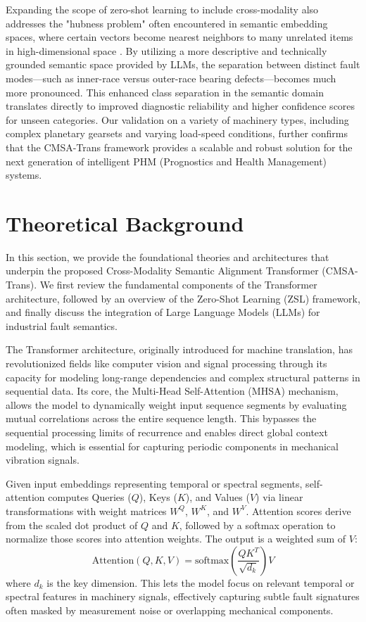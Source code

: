 \documentclass[journal]{IEEEtran}
\begin{document}
Expanding the scope of zero-shot learning to include cross-modality also addresses the "hubness problem" often encountered in semantic embedding spaces, where certain vectors become nearest neighbors to many unrelated items in high-dimensional space \cite{radovanovic2010hubs}. By utilizing a more descriptive and technically grounded semantic space provided by LLMs, the separation between distinct fault modes—such as inner-race versus outer-race bearing defects—becomes much more pronounced. This enhanced class separation in the semantic domain translates directly to improved diagnostic reliability and higher confidence scores for unseen categories. Our validation on a variety of machinery types, including complex planetary gearsets and varying load-speed conditions, further confirms that the CMSA-Trans framework provides a scalable and robust solution for the next generation of intelligent PHM (Prognostics and Health Management) systems.

\section{Theoretical Background}
In this section, we provide the foundational theories and architectures that underpin the proposed Cross-Modality Semantic Alignment Transformer (CMSA-Trans). We first review the fundamental components of the Transformer architecture, followed by an overview of the Zero-Shot Learning (ZSL) framework, and finally discuss the integration of Large Language Models (LLMs) for industrial fault semantics.

The Transformer architecture, originally introduced for machine translation, has revolutionized fields like computer vision and signal processing through its capacity for modeling long-range dependencies and complex structural patterns in sequential data. Its core, the Multi-Head Self-Attention (MHSA) mechanism, allows the model to dynamically weight input sequence segments by evaluating mutual correlations across the entire sequence length. This bypasses the sequential processing limits of recurrence and enables direct global context modeling, which is essential for capturing periodic components in mechanical vibration signals.

Given input embeddings representing temporal or spectral segments, self-attention computes Queries ($Q$), Keys ($K$), and Values ($V$) via linear transformations with weight matrices $W^Q$, $W^K$, and $W^V$. Attention scores derive from the scaled dot product of $Q$ and $K$, followed by a softmax operation to normalize those scores into attention weights. The output is a weighted sum of $V$:
\begin{equation}
\text{Attention}(Q, K, V) = \text{softmax}\left(\frac{QK^T}{\sqrt{d_k}}\right)V
\end{equation}
where $d_k$ is the key dimension. This lets the model focus on relevant temporal or spectral features in machinery signals, effectively capturing subtle fault signatures often masked by measurement noise or overlapping mechanical components.
\end{document}
